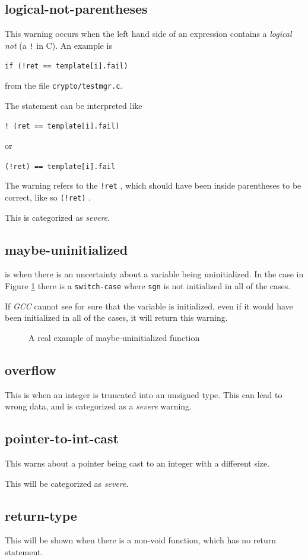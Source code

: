 \documentclass[a4paper,11pt]{report}
\newcommand{\textcode}[1]{
    \fboxsep=1pt
    \texttt{\colorbox{gray!20}{#1}}
}
\newcommand{\figa}{
    \begin{figure}[!htpb]
    \centering
}
\newcommand{\figb}[2]{
    \caption{#1}
    \label{#2}
    \end{figure}
}
\begin{document}
            \subsection*{logical-not-parentheses}
This warning occurs when the left hand side of an expression contains a 
\emph{logical not} (a \texttt{!} in C). An example is 
    \textcode{if (!ret == template[i].fail)} 
from the file \texttt{crypto/testmgr.c}.

The statement can be interpreted like 
\textcode{! (ret == template[i].fail)} 
or 
\textcode{(!ret) == template[i].fail}


The warning refers to the \textcode{!ret}, which should have been inside 
parentheses to be correct, like so \textcode{(!ret)}.

This is categorized as \emph{severe}.

            \subsection*{maybe-uninitialized}
is when there is an uncertainty about a variable being uninitialized. In the 
case in Figure \ref{lst:maybeuninitializedreal} there is a 
\texttt{switch-case} where \texttt{sgn} is not initialized in all of the cases.

If \emph{GCC} cannot see for sure that the variable is initialized, 
even if it would have been initialized in all of the cases, it will return this 
warning.

\figa
    
\figb{A real example of maybe-uninitialized function}{lst:maybeuninitializedreal}


            \subsection*{overflow}
This is when an integer is truncated into an unsigned type. This can lead to 
wrong data, and is categorized as a \emph{severe} warning.

            \subsection*{pointer-to-int-cast}
            \label{par:pointertoint}
This warns about a pointer being cast to an integer with a different size.

This will be categorized as \emph{severe}.


            \subsection*{return-type}
This will be shown when there is a non-void function, which has no return 
statement.
\end{document}
